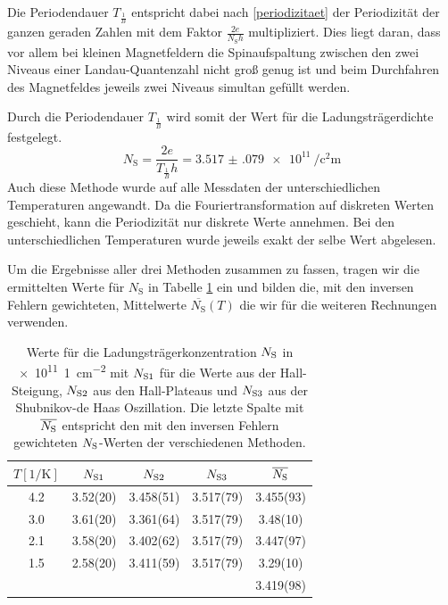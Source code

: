 \documentclass[paper=a4,fontsize=10pt,DIV=18,twocolumn,parskip=half]{scrartcl}
\numberwithin{equation}{section}    %
\newcommand{\kor}[1]{{\color{darkgreen}#1}}
\begin{document}
Die Periodendauer $T_{\frac{1}{B}}$ entspricht dabei nach \eqref{periodizitaet} der Periodizität der ganzen geraden Zahlen mit dem Faktor $\frac{2 e}{N_\mathrm{S} h}$ multipliziert. Dies liegt daran, dass vor allem bei kleinen Magnetfeldern die Spinaufspaltung zwischen den zwei Niveaus einer Landau-Quantenzahl nicht groß genug ist und beim Durchfahren des Magnetfeldes jeweils zwei Niveaus simultan gefüllt werden.

Durch die Periodendauer $T_{\frac{1}{B}}$ wird somit der Wert für die Ladungsträgerdichte festgelegt.
\begin{equation}
N_\mathrm{S}=\frac{2 e}{T_{\frac{1}{B}} h}=\SI{3.517(079)e11}{\per\square\centi\meter}
\label{ns_periode}
\end{equation}
Auch diese Methode wurde auf alle Messdaten der unterschiedlichen Temperaturen angewandt. Da die Fouriertransformation auf diskreten Werten geschieht, kann die Periodizität nur diskrete Werte annehmen. Bei den unterschiedlichen Temperaturen wurde jeweils exakt der selbe Wert abgelesen.

Um die Ergebnisse aller drei Methoden zusammen zu fassen, tragen wir die ermittelten Werte für $N_\mathrm{S}$ in Tabelle \ref{nswerte} ein und bilden die, mit den inversen Fehlern gewichteten, Mittelwerte $\overline{N_\mathrm{S}}(T)$ die wir für die weiteren Rechnungen verwenden.

\begin{table}[htp]
	\begin{center}
		\begin{tabular}{ccccc}
			\hline
			$T[1/\mathrm{K}]$ & $N_{\rm S1}$ & $N_{\rm S2}$ & $N_{\rm S3}$ & $\overline{N_{\rm S}}$\\
			\hline
			4.2 & 3.52(20) & \kor{3.458(51)} & 3.517(79) & 3.455(93)\\
			3.0 & 3.61(20) & \kor{3.361(64)} & 3.517(79) & 3.48(10)\\
			2.1 & 3.58(20) & \kor{3.402(62)} & 3.517(79) & 3.447(97)\\
			1.5 & 2.58(20) & \kor{3.411(59)} & 3.517(79) & 3.29(10)\\
			\hline
			\hline
			 &  &  &  &3.419(98)\\
		\end{tabular}
		\caption{Werte für die Ladungsträgerkonzentration $N_{\rm S}$ in \SI[per-mode=symbol]{e11}{1\per\centi\meter\squared} mit $N_{\rm S1}$ für die Werte aus der Hall-Steigung, $N_{\rm S2}$ aus den Hall-Plateaus und $N_{\rm S3}$ aus der Shubnikov-de Haas Oszillation. Die letzte Spalte mit $\overline{N_{\rm S}}$ entspricht den mit den inversen Fehlern gewichteten $N_{\rm S}$-Werten der verschiedenen Methoden.}
		\label{nswerte}
	\end{center}
\end{table}
\end{document}
